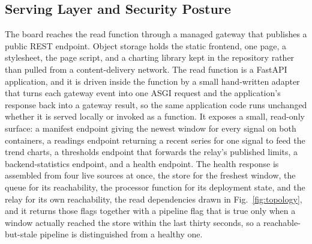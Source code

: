\documentclass[conference]{IEEEtran}
\begin{document}
\subsection{Serving Layer and Security Posture}

The board reaches the read function through a managed gateway that publishes a public REST endpoint. Object storage holds the static frontend, one page, a stylesheet, the page script, and a charting library kept in the repository rather than pulled from a content-delivery network. The read function is a FastAPI application, and it is driven inside the function by a small hand-written adapter that turns each gateway event into one ASGI request and the application's response back into a gateway result, so the same application code runs unchanged whether it is served locally or invoked as a function. It exposes a small, read-only surface: a manifest endpoint giving the newest window for every signal on both containers, a readings endpoint returning a recent series for one signal to feed the trend charts, a thresholds endpoint that forwards the relay's published limits, a backend-statistics endpoint, and a health endpoint. The health response is assembled from four live sources at once, the store for the freshest window, the queue for its reachability, the processor function for its deployment state, and the relay for its own reachability, the read dependencies drawn in Fig.~\ref{fig:topology}, and it returns those flags together with a pipeline flag that is true only when a window actually reached the store within the last thirty seconds, so a reachable-but-stale pipeline is distinguished from a healthy one.
\end{document}
